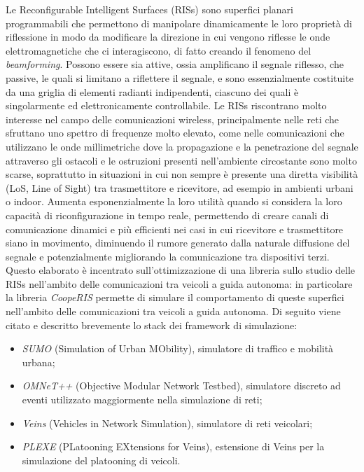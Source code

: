 Le Reconfigurable Intelligent Surfaces (RISs) sono superfici planari
programmabili che permettono di manipolare dinamicamente le loro proprietà di
riflessione in modo da modificare la direzione in cui vengono riflesse le onde
elettromagnetiche che ci interagiscono, di fatto creando il fenomeno del \textit{beamforming}.
Possono essere sia attive, ossia amplificano il segnale riflesso, che passive,
le quali si limitano a riflettere il segnale, e sono essenzialmente costituite da
una griglia di elementi radianti indipendenti, ciascuno dei quali è
singolarmente ed elettronicamente controllabile. Le RISs riscontrano molto interesse
nel campo delle comunicazioni wireless, principalmente nelle reti che sfruttano
uno spettro di frequenze molto elevato, come nelle comunicazioni che utilizzano le
onde millimetriche dove la propagazione e la penetrazione del segnale attraverso
gli ostacoli e le ostruzioni presenti nell'ambiente circostante sono molto scarse,
soprattutto in situazioni in cui non sempre è presente una diretta visibilità (LoS,
Line of Sight) tra trasmettitore e ricevitore, ad esempio in ambienti urbani o
indoor. Aumenta esponenzialmente la loro utilità quando si considera la loro capacità
di riconfigurazione in tempo reale, permettendo di creare canali di
comunicazione dinamici e più efficienti nei casi in cui ricevitore e
trasmettitore siano in movimento, diminuendo il rumore generato dalla naturale diffusione
del segnale e potenzialmente migliorando la comunicazione tra dispositivi terzi.
Questo elaborato è incentrato sull'ottimizzazione di una libreria sullo studio
delle RISs nell'ambito delle comunicazioni tra veicoli a guida autonoma: in particolare
la libreria \textit{CoopeRIS}\cite{cooperis} permette di simulare il comportamento
di queste superfici nell'ambito delle comunicazioni tra veicoli a guida autonoma.
Di seguito viene citato e descritto brevemente lo stack dei framework di
simulazione:
\begin{itemize}
  \item \textit{SUMO} (Simulation of Urban MObility), simulatore di traffico e mobilità
    urbana\cite{sumo};

  \item \textit{OMNeT++} (Objective Modular Network Testbed), simulatore discreto
    ad eventi utilizzato maggiormente nella simulazione di reti\cite{omnetpp};

  \item \textit{Veins} (Vehicles in Network Simulation), simulatore di reti veicolari\cite{veins};

  \item \textit{PLEXE} (PLatooning EXtensions for Veins), estensione di Veins per
    la simulazione del platooning di veicoli\cite{plexe}.
\end{itemize}

